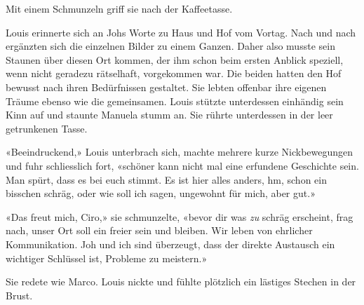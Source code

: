 Mit einem Schmunzeln griff sie nach der Kaffeetasse.

Louis erinnerte sich an Johs Worte zu Haus und Hof vom Vortag. Nach und
nach ergänzten sich die einzelnen Bilder zu einem Ganzen. Daher also
musste sein Staunen über diesen Ort kommen, der ihm schon beim ersten
Anblick speziell, wenn nicht geradezu rätselhaft, vorgekommen war. Die
beiden hatten den Hof bewusst nach ihren Bedürfnissen gestaltet. Sie
lebten offenbar ihre eigenen Träume ebenso wie die gemeinsamen.
Louis stützte unterdessen einhändig sein Kinn auf und staunte Manuela 
stumm an. Sie rührte unterdessen in der leer getrunkenen Tasse.

«Beeindruckend,» Louis unterbrach sich, machte mehrere kurze Nickbewegungen und fuhr schliesslich fort, 
«schöner kann nicht mal eine erfundene Geschichte sein. Man spürt, dass es bei euch stimmt. Es ist
hier alles anders, hm, schon ein bisschen schräg, oder wie soll ich sagen, ungewohnt für mich, aber gut.»

«Das freut mich, Ciro,» sie schmunzelte, «bevor dir was \emph{zu} schräg
erscheint, frag nach, unser Ort soll ein freier sein und bleiben. Wir
leben von ehrlicher Kommunikation. Joh und ich sind überzeugt, dass der
direkte Austausch ein wichtiger Schlüssel ist, Probleme zu meistern.»

Sie redete wie Marco. Louis nickte und fühlte plötzlich ein lästiges
Stechen in der Brust.
